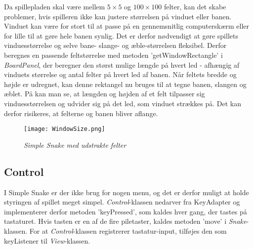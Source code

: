 Da spillepladen skal være mellem $5\times 5$ og $100\times 100$ felter, kan det skabe problemer, hvis spilleren ikke kan justere størrelsen på vinduet eller banen. Vinduet kan være for stort til at passe på en gennemsnitlig computerskærm eller for lille til at gøre hele banen synlig. Det er derfor nødvendigt at gøre spillets vinduesstørrelse og selve bane- slange- og æble-størrelsen fleksibel. Derfor beregnes en passende feltstørrelse med metoden 'getWindowRectangle' i \textit{BoardPanel}, der beregner den størst mulige længde på hvert led - afhængig af vinduets størrelse og antal felter på hvert led af banen. Når feltets bredde og højde er udregnet, kan denne rektangel nu bruges til at tegne banen, slangen og æblet.
På  kan man se, at længden og højden af et felt tilpasser sig vinduesstørrelsen og udvider sig på det led, som vinduet strækkes på. Det kan derfor risikeres, at felterne og banen bliver aflange.

\begin{figure}[h]
	\centering
	\texttt{[image: WindowSize.png]}
	\caption{\textit{Simple Snake med udstrakte felter}}
\end{figure}

\subsection{Control}
I Simple Snake er der ikke brug for nogen menu, og det er derfor muligt at holde styringen af spillet meget simpel. \textit{Control}-klassen nedarver fra KeyAdapter og implementerer derfor metoden 'keyPressed', som kaldes hver gang, der tastes på tastaturet. Hvis tasten er en af de fire piletaster, kaldes metoden 'move' i \textit{Snake}-klassen. For at \textit{Control}-klassen registrerer tastatur-input, tilføjes den som keyListener til \textit{View}-klassen.